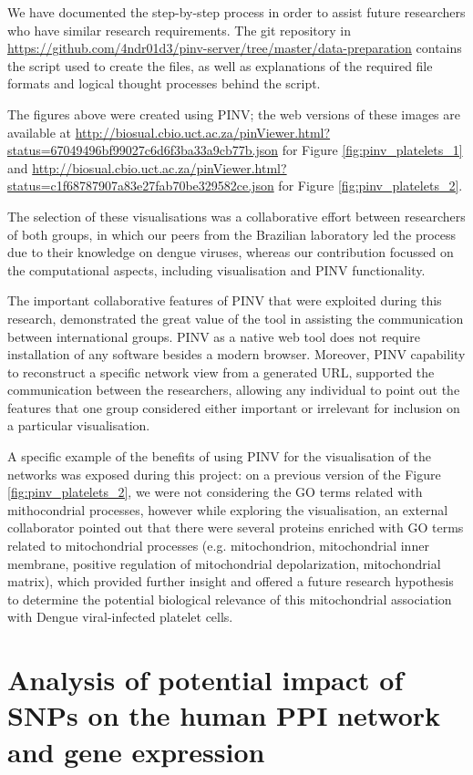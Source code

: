 We have documented the step-by-step process in order to assist future researchers who have similar research requirements. The git repository in \url{https://github.com/4ndr01d3/pinv-server/tree/master/data-preparation} contains the script used to create the files, as well as explanations of the required file formats and logical thought processes behind the script.

The figures above were created using PINV; the web versions of these images are available at \url{http://biosual.cbio.uct.ac.za/pinViewer.html?status=67049496bf99027c6d6f3ba33a9cb77b.json} for Figure \ref{fig:pinv_platelets_1} and \url{http://biosual.cbio.uct.ac.za/pinViewer.html?status=c1f68787907a83e27fab70be329582ce.json} for Figure \ref{fig:pinv_platelets_2}.

The selection of these visualisations was a collaborative effort between researchers of both groups, in which our peers from the Brazilian laboratory led the process due to their knowledge on dengue viruses, whereas our contribution focussed on the computational aspects, including visualisation and PINV functionality.

The important collaborative features of PINV that were exploited during this research, demonstrated the great value of the tool in assisting the communication between international groups. PINV as a native web tool does not require installation of any software besides a modern browser. Moreover, PINV capability to reconstruct a specific network view from a generated URL, supported the communication between the researchers, allowing any individual to point out the features that one group considered either important or irrelevant for inclusion on a particular visualisation.

A specific example of the benefits of using PINV for the visualisation of the networks was exposed during this project: on a previous version of the Figure \ref{fig:pinv_platelets_2}, we were not considering the GO terms related with mithocondrial processes, however while exploring the visualisation, an external collaborator pointed out that there were several proteins enriched with GO terms related to mitochondrial processes (e.g. mitochondrion, mitochondrial inner membrane, positive regulation of mitochondrial depolarization, mitochondrial matrix), which provided further insight and offered a future research hypothesis to determine the potential biological relevance of this mitochondrial association with Dengue viral-infected platelet cells.

\section{Analysis of potential impact of SNPs on the human PPI network and gene expression}
\label{sec:pop_genetics}
